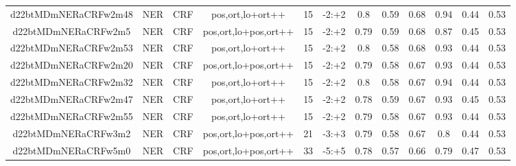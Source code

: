 \documentclass[a4paper]{article}
\begin{document}
\begin{landscape}
\begin{center}
\begin{tabular}{ |c|c|c|c|c|c|c|c|c|c|c|c|}
 	
 
 	
 		
 		\small{ d22btMDmNERaCRFw2m48 } & NER & CRF & pos,ort,lo+ort++  &  15 &  -2:+2  &  0.8 & 0.59 & 0.68  &  0.94 & 0.44 & 0.53 \\
 		

 	
 
 	
 		
 		\small{ d22btMDmNERaCRFw2m5 } & NER & CRF & pos,ort,lo+pos,ort++  &  15 &  -2:+2  &  0.79 & 0.59 & 0.68  &  0.87 & 0.45 & 0.53 \\
 		

 	
 
 	
 		
 		\small{ d22btMDmNERaCRFw2m53 } & NER & CRF & pos,ort,lo+ort++  &  15 &  -2:+2  &  0.8 & 0.58 & 0.68  &  0.93 & 0.44 & 0.53 \\
 		

 	
 
 	
 		
 		\small{ d22btMDmNERaCRFw2m20 } & NER & CRF & pos,ort,lo+pos,ort++  &  15 &  -2:+2  &  0.79 & 0.58 & 0.67  &  0.93 & 0.44 & 0.53 \\
 		

 	
 
 	
 		
 		\small{ d22btMDmNERaCRFw2m32 } & NER & CRF & pos,ort,lo+ort++  &  15 &  -2:+2  &  0.8 & 0.58 & 0.67  &  0.94 & 0.44 & 0.53 \\
 		

 	
 
 	
 		
 		\small{ d22btMDmNERaCRFw2m47 } & NER & CRF & pos,ort,lo+ort++  &  15 &  -2:+2  &  0.78 & 0.59 & 0.67  &  0.93 & 0.45 & 0.53 \\
 		

 	
 
 	
 		
 		\small{ d22btMDmNERaCRFw2m55 } & NER & CRF & pos,ort,lo+ort++  &  15 &  -2:+2  &  0.79 & 0.58 & 0.67  &  0.93 & 0.44 & 0.53 \\
 		

 	
 
 	
 		
 		\small{ d22btMDmNERaCRFw3m2 } & NER & CRF & pos,ort,lo+pos,ort++  &  21 &  -3:+3  &  0.79 & 0.58 & 0.67  &  0.8 & 0.44 & 0.53 \\
 		

 	
 
 	
 		
 		\small{ d22btMDmNERaCRFw5m0 } & NER & CRF & pos,ort,lo+pos,ort++  &  33 &  -5:+5  &  0.78 & 0.57 & 0.66  &  0.79 & 0.47 & 0.53 \\
 		


\end{tabular}
\end{center}
\end{landscape}
\end{document}

